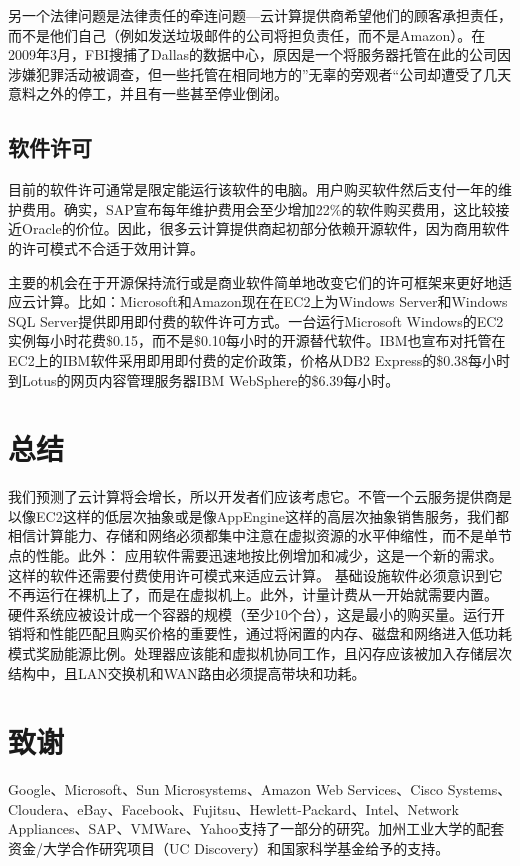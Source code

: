 另一个法律问题是法律责任的牵连问题—云计算提供商希望他们的顾客承担责任，而不是他们自己（例如发送垃圾邮件的公司将担负责任，而不是Amazon）。在2009年3月，FBI搜捕了Dallas的数据中心，原因是一个将服务器托管在此的公司因涉嫌犯罪活动被调查，但一些托管在相同地方的”无辜的旁观者“公司却遭受了几天意料之外的停工，并且有一些甚至停业倒闭。

\subsection{软件许可}

目前的软件许可通常是限定能运行该软件的电脑。用户购买软件然后支付一年的维护费用。确实，SAP宣布每年维护费用会至少增加22\%的软件购买费用，这比较接近Oracle的价位。因此，很多云计算提供商起初部分依赖开源软件，因为商用软件的许可模式不合适于效用计算。

主要的机会在于开源保持流行或是商业软件简单地改变它们的许可框架来更好地适应云计算。比如：Microsoft和Amazon现在在EC2上为Windows Server和Windows SQL Server提供即用即付费的软件许可方式。一台运行Microsoft Windows的EC2实例每小时花费\$0.15，而不是\$0.10每小时的开源替代软件。IBM也宣布对托管在EC2上的IBM软件采用即用即付费的定价政策，价格从DB2 Express的\$0.38每小时到Lotus的网页内容管理服务器IBM WebSphere的\$6.39每小时。

\section{总结}

我们预测了云计算将会增长，所以开发者们应该考虑它。不管一个云服务提供商是以像EC2这样的低层次抽象或是像AppEngine这样的高层次抽象销售服务，我们都相信计算能力、存储和网络必须都集中注意在虚拟资源的水平伸缩性，而不是单节点的性能。此外：
应用软件需要迅速地按比例增加和减少，这是一个新的需求。这样的软件还需要付费使用许可模式来适应云计算。
基础设施软件必须意识到它不再运行在裸机上了，而是在虚拟机上。此外，计量计费从一开始就需要内置。
硬件系统应被设计成一个容器的规模（至少10个台），这是最小的购买量。运行开销将和性能匹配且购买价格的重要性，通过将闲置的内存、磁盘和网络进入低功耗模式奖励能源比例。处理器应该能和虚拟机协同工作，且闪存应该被加入存储层次结构中，且LAN交换机和WAN路由必须提高带块和功耗。

\section*{致谢}

Google、Microsoft、Sun Microsystems、Amazon Web Services、Cisco Systems、Cloudera、eBay、Facebook、Fujitsu、Hewlett-Packard、Intel、Network Appliances、SAP、VMWare、Yahoo支持了一部分的研究。加州工业大学的配套资金/大学合作研究项目（UC Discovery）和国家科学基金给予的支持。
